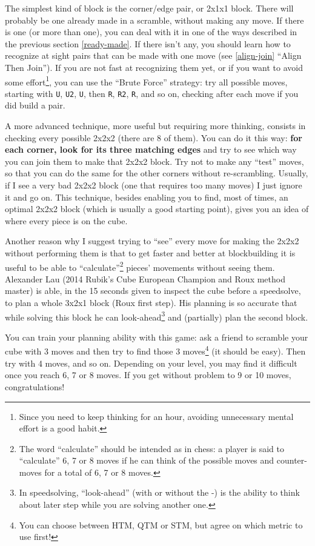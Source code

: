 \documentclass[11pt,a4paper]{book}
\newcommand{\p}{\textquotesingle}
\newcommand{\m}{\texttt}
\begin{document}
The simplest kind of block is the corner/edge pair, or 2x1x1 block. There will probably be one already made in a scramble, without making any move. If there is one (or more than one), you can deal with it in one of the ways described in the previous section \ref{ready-made}. If there isn't any, you should learn how to recognize at sight pairs that can be made with one move (see \ref{align-join} ``Align Then Join''). If you are not fast at recognizing them yet, or if you want to avoid some effort\footnote{Since you need to keep thinking for an hour, avoiding unnecessary mental effort is a good habit.}, you can use the ``Brute Force'' strategy: try all possible moves, starting with \m U, \m{U2}, \m{U\p}, then \m R, \m{R2}, \m{R\p}, and so on, checking after each move if you did build a pair.

A more advanced technique, more useful but requiring more thinking, consists in checking every possible 2x2x2 (there are 8 of them). You can do it this way: \textbf{for each corner, look for its three matching edges} and try to see which way you can join them to make that 2x2x2 block. Try not to make any ``test'' moves, so that you can do the same for the other corners without re-scrambling. Usually, if I see a very bad 2x2x2 block (one that requires too many moves) I just ignore it and go on. This technique, besides enabling you to find, most of times, an optimal 2x2x2 block (which is usually a good starting point), gives you an idea of where every piece is on the cube.

Another reason why I suggest trying to ``see'' every move for making the 2x2x2 without performing them is that to get faster and better at blockbuilding it is useful to be able to ``calculate''\footnote{The word ``calculate'' should be intended as in chess: a player is said to ``calculate'' 6, 7 or 8 moves if he can think of the possible moves and counter-moves for a total of 6, 7 or 8 moves.} pieces' movements without seeing them. Alexander Lau (2014 Rubik's Cube European Champion and Roux method master) is able, in the 15 seconds given to inspect the cube before a speedsolve, to plan a whole 3x2x1 block (Roux first step). His planning is so accurate that while solving this block he can look-ahead\footnote{In speedsolving, ``look-ahead'' (with or without the -) is the ability to think about later step while you are solving another one.} and (partially) plan the second block.

You can train your planning ability with this game: ask a friend to scramble your cube with 3 moves and then try to find those 3 moves\footnote{You can choose between HTM, QTM or STM, but agree on which metric to use first!} (it should be easy). Then try with 4 moves, and so on. Depending on your level, you may find it difficult once you reach 6, 7 or 8 moves. If you get without problem to 9 or 10 moves, congratulations!
\end{document}
